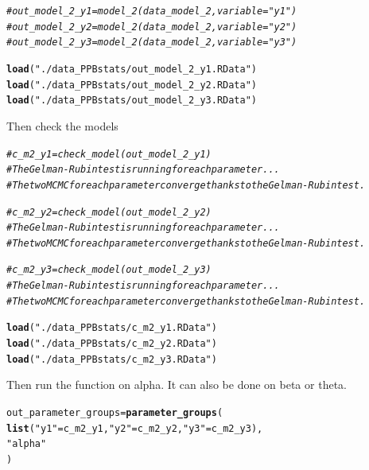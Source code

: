 \documentclass{article}\usepackage[]{graphicx}\usepackage[]{color}
\makeatletter
\newcommand{\hlstr}[1]{\textcolor[rgb]{0.192,0.494,0.8}{#1}}%
\newcommand{\hlcom}[1]{\textcolor[rgb]{0.678,0.584,0.686}{\textit{#1}}}%
\newcommand{\hlstd}[1]{\textcolor[rgb]{0.345,0.345,0.345}{#1}}%
\newcommand{\hlkwb}[1]{\textcolor[rgb]{0.69,0.353,0.396}{#1}}%
\newcommand{\hlkwd}[1]{\textcolor[rgb]{0.737,0.353,0.396}{\textbf{#1}}}%
\newenvironment{kframe}{%
 \def\at@end@of@kframe{}%
 \ifinner\ifhmode%
  \def\at@end@of@kframe{\end{minipage}}%
  \begin{minipage}{\columnwidth}%
 \fi\fi%
 \def\FrameCommand##1{\hskip\@totalleftmargin \hskip-\fboxsep
 \colorbox{shadecolor}{##1}\hskip-\fboxsep
     \hskip-\linewidth \hskip-\@totalleftmargin \hskip\columnwidth}%
 \MakeFramed {\advance\hsize-\width
   \@totalleftmargin\z@ \linewidth\hsize
   \@setminipage}}%
 {\par\unskip\endMakeFramed%
 \at@end@of@kframe}
\newenvironment{knitrout}{}{} %
\makeatother
\begin{document}
\begin{knitrout}
\color{fgcolor}\begin{kframe}
\begin{alltt}
\hlcom{# out_model_2_y1 = model_2(data_model_2, variable = "y1")}
\hlcom{# out_model_2_y2 = model_2(data_model_2, variable = "y2")}
\hlcom{# out_model_2_y3 = model_2(data_model_2, variable = "y3")}

\hlkwd{load}\hlstd{(}\hlstr{"./data_PPBstats/out_model_2_y1.RData"}\hlstd{)}
\hlkwd{load}\hlstd{(}\hlstr{"./data_PPBstats/out_model_2_y2.RData"}\hlstd{)}
\hlkwd{load}\hlstd{(}\hlstr{"./data_PPBstats/out_model_2_y3.RData"}\hlstd{)}
\end{alltt}
\end{kframe}
\end{knitrout}

Then check the models

\begin{knitrout}
\color{fgcolor}\begin{kframe}
\begin{alltt}
\hlcom{# c_m2_y1 = check_model(out_model_2_y1)}
\hlcom{# The Gelman-Rubin test is running for each parameter ...}
\hlcom{# The two MCMC for each parameter converge thanks to the Gelman-Rubin test.}

\hlcom{# c_m2_y2 = check_model(out_model_2_y2)}
\hlcom{# The Gelman-Rubin test is running for each parameter ...}
\hlcom{# The two MCMC for each parameter converge thanks to the Gelman-Rubin test.}

\hlcom{# c_m2_y3 = check_model(out_model_2_y3)}
\hlcom{# The Gelman-Rubin test is running for each parameter ...}
\hlcom{# The two MCMC for each parameter converge thanks to the Gelman-Rubin test.}

\hlkwd{load}\hlstd{(}\hlstr{"./data_PPBstats/c_m2_y1.RData"}\hlstd{)}
\hlkwd{load}\hlstd{(}\hlstr{"./data_PPBstats/c_m2_y2.RData"}\hlstd{)}
\hlkwd{load}\hlstd{(}\hlstr{"./data_PPBstats/c_m2_y3.RData"}\hlstd{)}
\end{alltt}
\end{kframe}
\end{knitrout}

Then run the function on alpha. 
It can also be done on beta or theta.

\begin{knitrout}
\color{fgcolor}\begin{kframe}
\begin{alltt}
\hlstd{out_parameter_groups} \hlkwb{=} \hlkwd{parameter_groups}\hlstd{(}
  \hlkwd{list}\hlstd{(}\hlstr{"y1"} \hlstd{= c_m2_y1,} \hlstr{"y2"} \hlstd{= c_m2_y2,} \hlstr{"y3"} \hlstd{= c_m2_y3),}
  \hlstr{"alpha"}
  \hlstd{)}
\end{alltt}
\end{kframe}
\end{knitrout}
\end{document}
